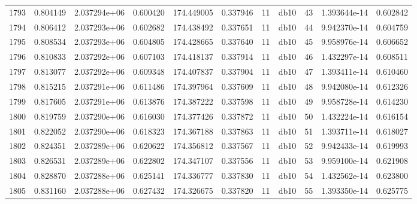 \begin{tabular}{lrrrrrrlrrr}
1793 &    0.804149 &        2.037294e+06 &  0.600420 &              174.449005 &    0.337946 &      11 &         db10 &     43 &   1.393644e-14 &      0.602842 \\
1794 &    0.806412 &        2.037293e+06 &  0.602682 &              174.438492 &    0.337651 &      11 &         db10 &     44 &   9.942370e-14 &      0.604759 \\
1795 &    0.808534 &        2.037293e+06 &  0.604805 &              174.428665 &    0.337640 &      11 &         db10 &     45 &   9.958976e-14 &      0.606652 \\
1796 &    0.810833 &        2.037292e+06 &  0.607103 &              174.418137 &    0.337914 &      11 &         db10 &     46 &   1.432297e-14 &      0.608511 \\
1797 &    0.813077 &        2.037292e+06 &  0.609348 &              174.407837 &    0.337904 &      11 &         db10 &     47 &   1.393411e-14 &      0.610460 \\
1798 &    0.815215 &        2.037291e+06 &  0.611486 &              174.397964 &    0.337609 &      11 &         db10 &     48 &   9.942080e-14 &      0.612326 \\
1799 &    0.817605 &        2.037291e+06 &  0.613876 &              174.387222 &    0.337598 &      11 &         db10 &     49 &   9.958728e-14 &      0.614230 \\
1800 &    0.819759 &        2.037290e+06 &  0.616030 &              174.377426 &    0.337872 &      11 &         db10 &     50 &   1.432224e-14 &      0.616154 \\
1801 &    0.822052 &        2.037290e+06 &  0.618323 &              174.367188 &    0.337863 &      11 &         db10 &     51 &   1.393711e-14 &      0.618027 \\
1802 &    0.824351 &        2.037289e+06 &  0.620622 &              174.356812 &    0.337567 &      11 &         db10 &     52 &   9.942433e-14 &      0.619993 \\
1803 &    0.826531 &        2.037289e+06 &  0.622802 &              174.347107 &    0.337556 &      11 &         db10 &     53 &   9.959100e-14 &      0.621908 \\
1804 &    0.828870 &        2.037288e+06 &  0.625141 &              174.336777 &    0.337830 &      11 &         db10 &     54 &   1.432562e-14 &      0.623800 \\
1805 &    0.831160 &        2.037288e+06 &  0.627432 &              174.326675 &    0.337820 &      11 &         db10 &     55 &   1.393350e-14 &      0.625775 \\

\end{tabular}
